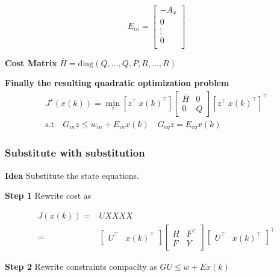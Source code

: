 \[
	E_{in} =
	\left[
		\begin{smallmatrix}
			-A_x \\
			0 \\
			\vdots \\
			0 \\
		\end{smallmatrix}
		\right]
\]

\textbf{Cost Matrix} $\bar{H} = \mathrm{diag}(Q,..., Q, P, R,..., R)$

\textbf{Finally the resulting quadratic optimization problem}
\[\begin{aligned}
		J^\star(x(k)) = \min_z  \left[ z^\top \ x(k)^\top \right]
		\left[\begin{smallmatrix} \bar{H} & 0 \\ 0 & Q \end{smallmatrix}\right]
		\left[ z^\top \ x(k)^\top \right]^\top \\
		\text{s.t}
		\quad G_{in}z \leq w_{in} + E_{in}x(k)
		\quad	G_{eq}z = E_{eq}x(k)
	\end{aligned}\]

\subsubsection{Substitute with substitution}

\textbf{Idea} Substitute the state equations.

\textbf{Step 1} Rewrite cost  as

\[\begin{aligned}
		J(x(k)) = & UXXXX              \\
		=         & \begin{bmatrix}
			            U^\top & x(k)^\top
		            \end{bmatrix}
		\left[\begin{smallmatrix}
				      H & F^\top \\
				      F & Y
			      \end{smallmatrix}\right]
		\begin{bmatrix}
			U^\top & x(k)^\top
		\end{bmatrix}^\top
	\end{aligned} \]

\textbf{Step 2} Rewrite constraints compaclty as $GU\le w+Ex(k)$

